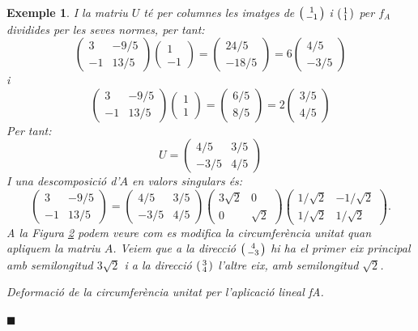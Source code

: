 \documentclass[
  11pt,
]{book}
\numberwithin{dummy}{section}
\theoremstyle{maincolornumbox}
\theoremstyle{blacknumex}
\newtheorem{exampleT}{Exemple}[chapter]
\theoremstyle{blacknumbox}
\theoremstyle{maincolornum}
\newenvironment{example}{\begin{exampleT}}{\hfill{\tiny\ensuremath{\blacksquare}}\end{exampleT}}
\begin{document}
\begin{example}
I la matriu \(U\) té per columnes les imatges de \(\left(\begin{smallmatrix}1\\-1\end{smallmatrix}\right)\) i
\(\left(\begin{smallmatrix}1\\1\end{smallmatrix}\right)\) per \(f_A\) dividides per les seves normes, per tant:
\[\begin{pmatrix}
3 & -9/5 \\ -1 & 13/5
\end{pmatrix} 
\begin{pmatrix}
1 \\ -1 
\end{pmatrix}=
\begin{pmatrix}
24/5 \\ -18/5
\end{pmatrix}=
6 \begin{pmatrix}
4/5 \\ -3/5
\end{pmatrix}\] i \[\begin{pmatrix}
3 & -9/5 \\ -1 & 13/5
\end{pmatrix} 
\begin{pmatrix}
1 \\ 1 
\end{pmatrix}=
\begin{pmatrix}
6/5 \\ 8/5
\end{pmatrix}=
2 \begin{pmatrix}
3/5 \\ 4/5
\end{pmatrix}\] Per tant: \[U=\begin{pmatrix}
4/5 & 3/5 \\ -3/5 & 4/5
\end{pmatrix}\] I una descomposició d'\(A\) en valors singulars és:
\[\begin{pmatrix}
3 & -9/5 \\ -1 & 13/5
\end{pmatrix} 
=\begin{pmatrix}
4/5 & 3/5 \\ -3/5 & 4/5
\end{pmatrix} 
\begin{pmatrix}
3\sqrt{2} & 0 \\ 0 & \sqrt{2}
\end{pmatrix}
\begin{pmatrix}
1/\sqrt{2} & -1/\sqrt{2} \\ 1/\sqrt{2} & 1/\sqrt{2}
\end{pmatrix}.\] A la Figura \hyperref[fig:circ-ellipse]{2} podem veure com es modifica la
circumferència unitat quan apliquem la matriu \(A\). Veiem que a la
direcció \(\left(\begin{smallmatrix}4\\-3\end{smallmatrix}\right)\) hi ha el primer eix principal amb semilongitud
\(3\sqrt{2}\) i a la direcció \(\left(\begin{smallmatrix}3\\4\end{smallmatrix}\right)\) l'altre eix, amb semilongitud
\(\sqrt{2}\).

Deformació de la circumferència unitat per l'aplicació
lineal {fA}.\label{fig:circ-ellipse}{}

\end{example}
\end{document}
